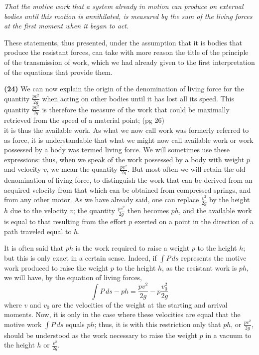 \documentclass{book}
\begin{document}
\textit{That the motive work that a system already in motion can produce on external bodies until this motion is annihilated, is measured by the sum of the living forces at the first moment when it began to act.}

These statements, thus presented, under the assumption that it is bodies that produce the resistant forces, can take with more reason the title of the principle of the transmission of work, which we had already given to the first interpretation of the equations that provide them.

\textbf{(24)} We can now explain the origin of the denomination of living force for the quantity \(\frac{pv^2}{2g}\) when acting on other bodies until it has lost all its speed. This quantity \(\frac{pv^2}{2g}\) is therefore the measure of the work that could be maximally retrieved from the speed of a material point; 
\newpage
(pg 26)\\
it is thus the available work. As what we now call work was formerly referred to as force, it is understandable that what we might now call available work or work possessed by a body was termed living force. We will sometimes use these expressions: thus, when we speak of the work possessed by a body with weight \( p \) and velocity \( v \), we mean the quantity \( \frac{pv^2}{2g} \). But most often we will retain the old denomination of living force, to distinguish the work that can be derived from an acquired velocity from that which can be obtained from compressed springs, and from any other motor. As we have already said, one can replace \( \frac{v^2}{2g} \) by the height \( h \) due to the velocity \( v \); the quantity \( \frac{pv^2}{2g} \) then becomes \( ph \), and the available work is equal to that resulting from the effort \( p \) exerted on a point in the direction of a path traveled equal to \( h \).

It is often said that \( ph \) is the work required to raise a weight \( p \) to the height \( h \); but this is only exact in a certain sense. Indeed, if \( \int P \, ds \) represents the motive work produced to raise the weight \( p \) to the height \( h \), as the resistant work is \( ph \), we will have, by the equation of living forces,
\[ \int P \, ds - ph = \frac{pv^2}{2g} - p \frac{v_0^2}{2g} \]
where \( v \) and \( v_0 \) are the velocities of the weight at the starting and arrival moments. Now, it is only in the case where these velocities are equal that the motive work \( \int P \, ds \) equals \( ph \); thus, it is with this restriction only that \( ph \), or \( \frac{pv^2}{2g} \), should be understood as the work necessary to raise the weight \( p \) in a vacuum to the height \( h \) or \( \frac{v^2}{2g} \).
\end{document}
